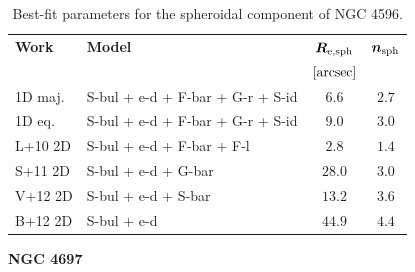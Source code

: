 \documentclass[preprint2]{emulateapj}
\begin{document}
  \begin{table}[h]
  \small
  \caption{Best-fit parameters for the spheroidal component of NGC 4596.}
  \begin{center}
  \begin{tabular}{llcc}
  \hline
  {\bf Work} & {\bf Model}   & $\bm R_{\rm e,sph}$    & $\bm n_{\rm sph}$ \\
    &  &  $[\rm arcsec]$ & \\
  \hline
  1D maj. & S-bul + e-d + F-bar + G-r + S-id & $6.6$  &  $2.7$ \\
  1D eq.  & S-bul + e-d + F-bar + G-r + S-id & $9.0$  &  $3.0$ \\
  \hline
  L+10 2D      & S-bul + e-d + F-bar + F-l & $2.8$  &  $1.4$ \\
  S+11 2D      & S-bul + e-d + G-bar & $28.0$  &  $3.0$ \\
  V+12 2D      & S-bul + e-d + S-bar & $13.2$  &  $3.6$ \\
  B+12 2D      & S-bul + e-d & $44.9$  &  $4.4$ \\
  \hline
  \end{tabular}
  \end{center}
  \label{tab:n4596}
  \end{table}



  \clearpage\newpage\noindent
  {\bf NGC 4697 \\}
\end{document}
